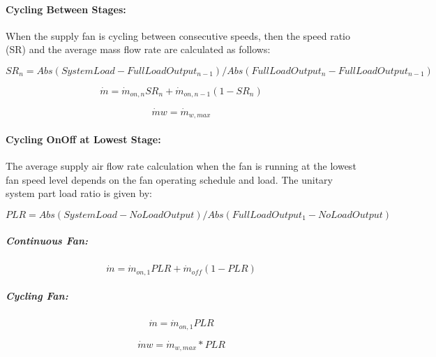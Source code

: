 \paragraph{Cycling Between Stages:}\label{cycling-between-stages}

When the supply fan is cycling between consecutive speeds, then the speed ratio (SR) and the average mass flow rate are calculated as follows:

\begin{equation}
  {SR_{n}} = Abs({SystemLoad} - {FullLoadOutput_{n-1}}) / Abs({FullLoadOutput_{n}} - {FullLoadOutput_{n-1}})
\end{equation}
  
\begin{equation}
  {\dot m} = {\dot m_{on, n}} {SR_{n}} + {\dot m_{on, n-1}} (1 - {SR_{n}})
\end{equation}

\begin{equation}
  {\dot m{w}} = {\dot m_{w, max}}
\end{equation}

\paragraph{Cycling OnOff at Lowest Stage:}\label{cycling-onoff-at-lowest-stage}

The average supply air flow rate calculation when the fan is running at the lowest fan speed level depends on the fan operating schedule and load. The unitary system part load ratio is given by:

\begin{equation}
{PLR} = Abs({SystemLoad} - {NoLoadOutput}) / Abs({FullLoadOutput_{1}} - {NoLoadOutput})
\end{equation}

\subparagraph{Continuous Fan:}\label{continuous-fan}

\begin{equation}
{\dot m} = {\dot m_{on, 1}} {PLR} + {\dot m_{off}} (1 - {PLR})
\end{equation}

\subparagraph{Cycling Fan:}\label{cycling-fan}

\begin{equation}
  {\dot m} = {\dot m_{on, 1}} {PLR}
\end{equation}
  
\begin{equation}
  {\dot m{w}} = {\dot m_{w, max}} * {PLR}
\end{equation}

